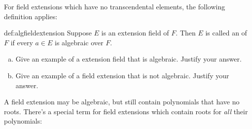 
For field extensions which have no transcendental elements, the following definition applies:

\begin{defn}{def:algfieldextension}  
Suppose $E$ is an extension field of $F$. Then $E$ is called an  of $F$ if every $a\in E$ is algebraic over $F$. %
 \end{defn}

\begin{exercise}{}
\begin{enumerate}[(a)]
\item
Give an example of a extension field that is algebraic. Justify your answer.
\item
Give an example of a field extension that is not algebraic. Justify your answer.
\end{enumerate}
\end{exercise}

A field extension may be algebraic, but still contain polynomials that have no roots. There's a special term for field extensions which contain roots for \emph{all} their polynomials:


